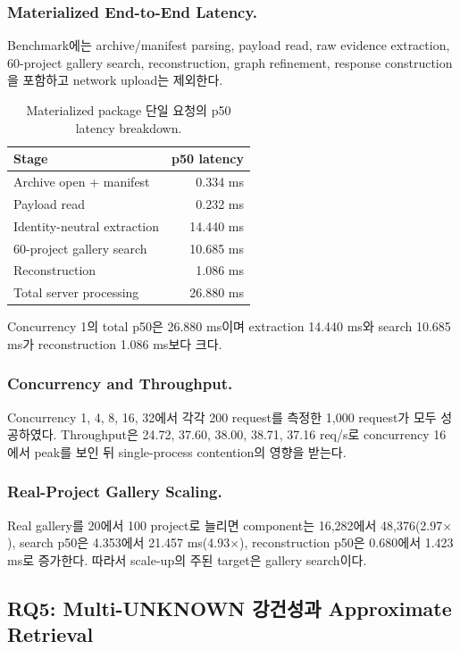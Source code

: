 \documentclass[runningheads]{llncs}
\begin{document}
\subsubsection{Materialized End-to-End Latency.}
Benchmark에는 archive/manifest parsing, payload read, raw evidence extraction, 60-project gallery search, reconstruction, graph refinement, response construction을 포함하고 network upload는 제외한다.
\begin{table}[!htbp]
\centering
\caption{Materialized package 단일 요청의 p50 latency breakdown.}
\label{tab:latency}
\scriptsize
\begin{tabular}{lr}
\toprule
Stage & p50 latency\\
\midrule
Archive open + manifest & 0.334 ms\\
Payload read & 0.232 ms\\
Identity-neutral extraction & 14.440 ms\\
60-project gallery search & 10.685 ms\\
Reconstruction & 1.086 ms\\
Total server processing & 26.880 ms\\
\bottomrule
\end{tabular}
\end{table}
Concurrency 1의 total p50은 26.880 ms이며 extraction 14.440 ms와 search 10.685 ms가 reconstruction 1.086 ms보다 크다.

\subsubsection{Concurrency and Throughput.}
Concurrency 1, 4, 8, 16, 32에서 각각 200 request를 측정한 1,000 request가 모두 성공하였다. Throughput은 24.72, 37.60, 38.00, 38.71, 37.16 req/s로 concurrency 16에서 peak를 보인 뒤 single-process contention의 영향을 받는다.

\subsubsection{Real-Project Gallery Scaling.}
Real gallery를 20에서 100 project로 늘리면 component는 16,282에서 48,376(2.97$\times$), search p50은 4.353에서 21.457 ms(4.93$\times$), reconstruction p50은 0.680에서 1.423 ms로 증가한다. 따라서 scale-up의 주된 target은 gallery search이다.

\subsection{RQ5: Multi-UNKNOWN 강건성과 Approximate Retrieval}
\end{document}
